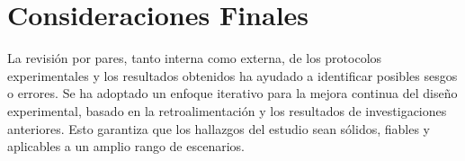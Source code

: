 \section{Consideraciones Finales}

La revisión por pares, tanto interna como externa, de los protocolos experimentales y los resultados obtenidos ha ayudado a identificar posibles sesgos o errores. Se ha adoptado un enfoque iterativo para la mejora continua del diseño experimental, basado en la retroalimentación y los resultados de investigaciones anteriores. Esto garantiza que los hallazgos del estudio sean sólidos, fiables y aplicables a un amplio rango de escenarios.


